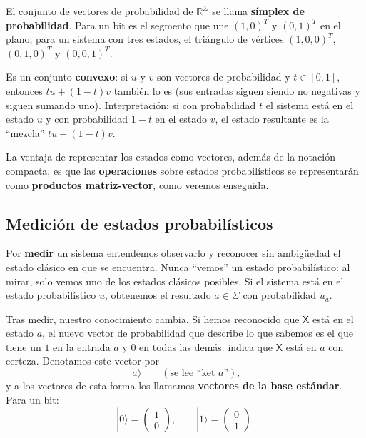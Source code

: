 \documentclass[11pt, a4paper, twoside, openright]{report}
\begin{document}
\begin{tcolorbox}[colback=blue!5!white,colframe=blue!75!black,title=\textbf{Nota Aclaratoria: La geometría de los vectores de probabilidad}]
El conjunto de vectores de probabilidad de $\mathbb{R}^\Sigma$ se llama \textbf{símplex de probabilidad}. Para un bit es el segmento que une $(1,0)^T$ y $(0,1)^T$ en el plano; para un sistema con tres estados, el triángulo de vértices $(1,0,0)^T$, $(0,1,0)^T$ y $(0,0,1)^T$.

Es un conjunto \textbf{convexo}: si $u$ y $v$ son vectores de probabilidad y $t \in [0,1]$, entonces $tu + (1-t)v$ también lo es (sus entradas siguen siendo no negativas y siguen sumando uno). Interpretación: si con probabilidad $t$ el sistema está en el estado $u$ y con probabilidad $1-t$ en el estado $v$, el estado resultante es la ``mezcla'' $tu + (1-t)v$.

La ventaja de representar los estados como vectores, además de la notación compacta, es que las \textbf{operaciones} sobre estados probabilísticos se representarán como \textbf{productos matriz-vector}, como veremos enseguida.
\end{tcolorbox}

\subsection{Medición de estados probabilísticos}

\noindent Por \textbf{medir} un sistema entendemos observarlo y reconocer sin ambigüedad el estado clásico en que se encuentra. Nunca ``vemos'' un estado probabilístico: al mirar, solo vemos uno de los estados clásicos posibles. Si el sistema está en el estado probabilístico $u$, obtenemos el resultado $a \in \Sigma$ con probabilidad $u_a$.

\noindent Tras medir, nuestro conocimiento cambia. Si hemos reconocido que $\mathsf{X}$ está en el estado $a$, el nuevo vector de probabilidad que describe lo que sabemos es el que tiene un $1$ en la entrada $a$ y $0$ en todas las demás: indica que $\mathsf{X}$ está en $a$ con certeza. Denotamos este vector por
\[ |a\rangle \qquad (\text{se lee ``ket } a\text{''}), \]
y a los vectores de esta forma los llamamos \textbf{vectores de la base estándar}. Para un bit:
\[ |0\rangle = \begin{pmatrix} 1 \\ 0 \end{pmatrix}, \qquad |1\rangle = \begin{pmatrix} 0 \\ 1 \end{pmatrix}. \]
\end{document}
